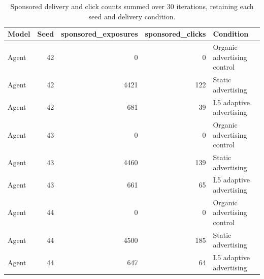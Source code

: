 \begin{table}[htbp!]
\centering
\small
\setlength{\tabcolsep}{3pt}
\renewcommand{\arraystretch}{1.1}
\begin{tabular}{lrrrl}
\hline
Model & Seed & sponsored\_exposures & sponsored\_clicks & Condition \\
\hline
Agent & 42 & 0 & 0 & Organic advertising control \\
Agent & 42 & 4421 & 122 & Static advertising \\
Agent & 42 & 681 & 39 & L5 adaptive advertising \\
Agent & 43 & 0 & 0 & Organic advertising control \\
Agent & 43 & 4460 & 139 & Static advertising \\
Agent & 43 & 661 & 65 & L5 adaptive advertising \\
Agent & 44 & 0 & 0 & Organic advertising control \\
Agent & 44 & 4500 & 185 & Static advertising \\
Agent & 44 & 647 & 64 & L5 adaptive advertising \\
\hline
\end{tabular}
\caption{Sponsored delivery and click counts summed over 30 iterations, retaining each seed and delivery condition.}
\label{chap:results:tab:rq1_advertising_totals}
\end{table}
